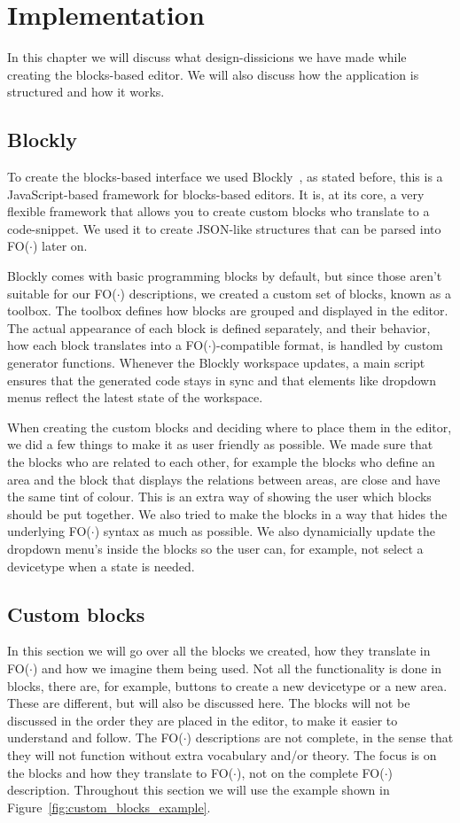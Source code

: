 \documentclass[11pt,a4paper]{report}
\newcommand{\fodot}{FO($\cdot$)\xspace}
\begin{document}
\chapter{Implementation}
In this chapter we will discuss what design-dissicions we have made while creating the blocks-based editor. We will also discuss how the application is structured and how it works.

\section{Blockly}

To create the blocks-based interface we used Blockly~\cite{Blockly}, as stated before, this is a JavaScript-based framework for blocks-based editors. It is, at its core, a very flexible framework that allows you to create custom blocks who translate to a code-snippet. We used it to create JSON-like structures that can be parsed into \fodot later on.

Blockly comes with basic programming blocks by default, but since those aren't suitable for our \fodot descriptions, we created a custom set of blocks, known as a toolbox. The toolbox defines how blocks are grouped and displayed in the editor. The actual appearance of each block is defined separately, and their behavior, how each block translates into a \fodot-compatible format, is handled by custom generator functions. Whenever the Blockly workspace updates, a main script ensures that the generated code stays in sync and that elements like dropdown menus reflect the latest state of the workspace.

When creating the custom blocks and deciding where to place them in the editor, we did a few things to make it as user friendly as possible. We made sure that the blocks who are related to each other, for example the blocks who define an area and the block that displays the relations between areas, are close and have the same tint of colour. This is an extra way of showing the user which blocks should be put together. We also tried to make the blocks in a way that hides the underlying \fodot syntax as much as possible. We also dynamicially update the dropdown menu's inside the blocks so the user can, for example, not select a devicetype when a state is needed.

\section{Custom blocks}
In this section we will go over all the blocks we created, how they translate in \fodot and how we imagine them being used. Not all the functionality is done in blocks, there are, for example, buttons to create a new devicetype or a new area. These are different, but will also be discussed here. The blocks will not be discussed in the order they are placed in the editor, to make it easier to understand and follow. The \fodot descriptions are not complete, in the sense that they will not function without extra vocabulary and/or theory. The focus is on the blocks and how they translate to \fodot, not on the complete \fodot description. Throughout this section we will use the example shown in Figure~\ref{fig:custom_blocks_example}.
\end{document}
